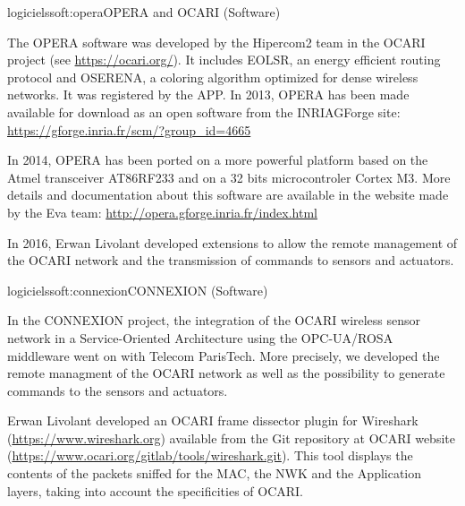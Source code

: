\documentclass{ra2016}
\newcommand{\pascale}          {\textbf{Pascale~Minet}}
\begin{document}
\begin{module}{logiciels}{soft:opera}{OPERA and OCARI (Software)} 

\begin{participants}
\end{participants}

The OPERA software was developed by the Hipercom2 team in the OCARI project (see \url{https://ocari.org/}). It includes EOLSR, an  energy efficient routing protocol and OSERENA, a coloring algorithm optimized for dense wireless networks. It was registered by the APP.
In 2013, OPERA has been made available for download as an open software from the INRIAGForge site: \url{https://gforge.inria.fr/scm/?group_id=4665}

In 2014, OPERA has been ported on a more powerful platform based on the Atmel transceiver AT86RF233 and on a 32 bits microcontroler Cortex M3.
More details and documentation about this software are available in the website made by the Eva team:
\url{http://opera.gforge.inria.fr/index.html}

In 2016, Erwan Livolant developed extensions to allow the remote management of the OCARI 
network and the transmission of commands to sensors and actuators. 


\end{module}

\begin{module}{logiciels}{soft:connexion}{CONNEXION (Software)} 

\begin{participants}
\end{participants}

In the CONNEXION project, the integration of the OCARI wireless sensor network
in a Service-Oriented Architecture using the OPC-UA/ROSA middleware went on with Telecom ParisTech. More precisely, we developed the remote managment of the OCARI network as well as the possibility to generate commands to the sensors and actuators. 

Erwan Livolant developed an OCARI frame dissector plugin for Wireshark (\url{https://www.wireshark.org}) available from the Git repository at OCARI website  (\url{https://www.ocari.org/gitlab/tools/wireshark.git}). This tool displays the contents of the packets sniffed for the MAC, the NWK and the Application layers, taking into account the specificities of OCARI.

\end{module}
\end{document}
